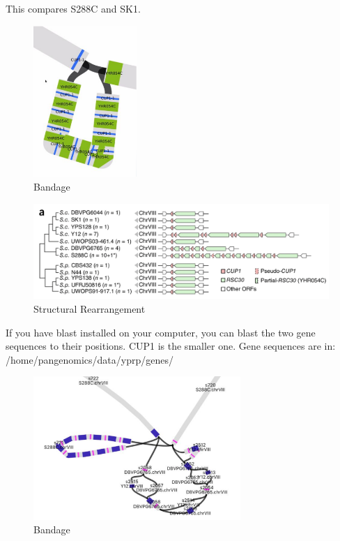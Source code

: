 \documentclass[
]{book}
\begin{document}
This compares S288C and SK1.

\begin{figure}
\centering
\includegraphics[width=0.35\textwidth,height=\textheight]{./Figures/Bandage4.png}
\caption{Bandage}
\end{figure}

\begin{figure}
\centering
\includegraphics[width=1\textwidth,height=\textheight]{./Figures/StructuralRearrangements.png}
\caption{Structural Rearrangement}
\end{figure}

If you have blast installed on your computer, you can blast the two gene sequences to their positions. CUP1 is the smaller one. Gene sequences are in: /home/pangenomics/data/yprp/genes/

\begin{figure}
\centering
\includegraphics[width=0.7\textwidth,height=\textheight]{./Figures/Bandage5.png}
\caption{Bandage}
\end{figure}
\end{document}
